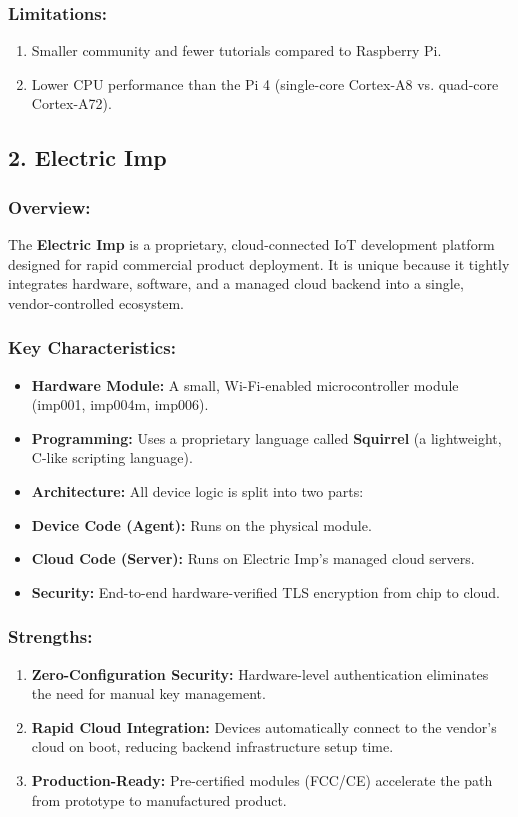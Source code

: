 \subsubsection{Limitations:}
\begin{enumerate}
  \item Smaller community and fewer tutorials compared to Raspberry Pi.
  \item Lower CPU performance than the Pi 4 (single-core Cortex-A8 vs. quad-core Cortex-A72).
\end{enumerate}


\subsection{2. Electric Imp}

\subsubsection{Overview:}
The \textbf{Electric Imp} is a proprietary, cloud-connected IoT development platform designed for rapid commercial product deployment. It is unique because it tightly integrates hardware, software, and a managed cloud backend into a single, vendor-controlled ecosystem.

\subsubsection{Key Characteristics:}
\begin{itemize}
  \item   \textbf{Hardware Module:} A small, Wi-Fi-enabled microcontroller module (imp001, imp004m, imp006).
  \item   \textbf{Programming:} Uses a proprietary language called \textbf{Squirrel} (a lightweight, C-like scripting language).
  \item   \textbf{Architecture:} All device logic is split into two parts:
  \item   \textbf{Device Code (Agent):} Runs on the physical module.
  \item   \textbf{Cloud Code (Server):} Runs on Electric Imp's managed cloud servers.
  \item   \textbf{Security:} End-to-end hardware-verified TLS encryption from chip to cloud.
\end{itemize}

\subsubsection{Strengths:}
\begin{enumerate}
  \item \textbf{Zero-Configuration Security:} Hardware-level authentication eliminates the need for manual key management.
  \item \textbf{Rapid Cloud Integration:} Devices automatically connect to the vendor's cloud on boot, reducing backend infrastructure setup time.
  \item \textbf{Production-Ready:} Pre-certified modules (FCC/CE) accelerate the path from prototype to manufactured product.
\end{enumerate}


